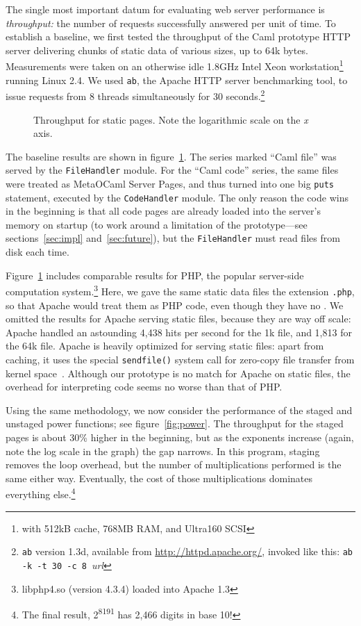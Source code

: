 \documentclass[preprint]{acm_proc_article-sp}
\def\MOC{MetaOCaml}
\newcommand{\myfig}[3]{%
  \begin{figure}[tbp]%
    #3%
    \caption{#2}%
    \label{fig:#1}%
  \end{figure}}
\newcommand{\gnuplot}[2]{%
  \myfig{#1}{#2}{}}
\begin{document}
The single most important datum for evaluating web server performance
is \textit{throughput:} the number of requests successfully answered
per unit of time.  To establish a baseline, we first tested the
throughput of the Caml prototype HTTP server delivering chunks of
static data of various sizes, up to 64k bytes.
Measurements were taken on an otherwise idle 1.8GHz Intel
Xeon\texttrademark{} workstation\footnote{with 512kB cache, 768MB RAM,
  and Ultra160 SCSI} running Linux 2.4.  We used \texttt{ab},
the Apache HTTP server benchmarking tool, to issue requests
from 8 threads simultaneously for 30 seconds.\footnote{\texttt{ab}
  version 1.3d, available from \url{http://httpd.apache.org/}, 
  invoked like this:
  \texttt{ab -k -t 30 -c 8 }\textit{url}}

\gnuplot{static}{Throughput for static pages.  Note the logarithmic
  scale on the \textit x axis.}

The baseline results are shown in figure~\ref{fig:static}.  The
series marked “Caml file” was served by the \texttt{FileHandler}
module.  For the “Caml code” series, the same files were treated
as \MOC{} Server Pages, and thus turned into one big
\texttt{puts} statement, executed by the \texttt{CodeHandler}
module.  The only reason the code wins in the beginning is that
all code pages are already loaded into the server’s memory on
startup (to work around a limitation of the prototype---see
sections~\ref{sec:impl} and~\ref{sec:future}), but the
\texttt{FileHandler} must read files from disk each time.

Figure~\ref{fig:static} includes comparable results for PHP, the
popular server-side computation system.\footnote{libphp4.so
  (version 4.3.4) loaded into Apache 1.3} Here, we gave the same
static data files the extension \texttt{.php}, so that Apache
would treat them as PHP code, even though they have no
.
We omitted the results for Apache serving static files, because they
are way off scale: Apache handled an astounding 4,438 hits per second
for the 1k file, and 1,813 for the 64k file.  Apache is heavily
optimized for serving static files: apart from caching, it uses the
special \texttt{sendfile()} system call for zero-copy file transfer
from kernel space~\cite{tranter03sendfile}.  Although our prototype is
no match for Apache on static files, the overhead for interpreting
code seems no worse than that of PHP.

Using the same methodology, we now consider the performance of
the staged and unstaged power functions; see
figure~\ref{fig:power}.  The throughput for the staged pages is
about 30\% higher in the beginning, but as the exponents
increase (again, note the log scale in the graph) the gap
narrows.  In this program, staging removes the loop overhead,
but the number of multiplications performed is the same either
way.  Eventually, the cost of those multiplications dominates
everything else.\footnote{The final result,
  2\textsuperscript{8191} has 2,466 digits in base 10!}
\end{document}
